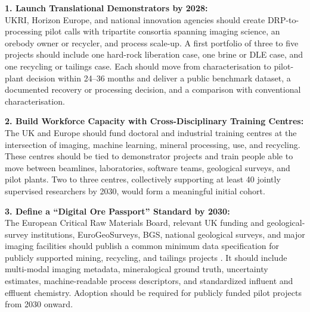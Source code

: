 \documentclass[12pt,a4paper]{article}
\begin{document}
\begin{tcolorbox}[enhanced, colback=gray!3!white, colframe=blue!40!black,
title=\textbf{Key Policy Recommendations}, colbacktitle=blue!40!black,
drop fuzzy shadow, fonttitle=\bfseries\normalsize, arc=1.2mm, boxrule=0.7pt,
boxsep=0.6mm, left=0.9mm, right=0.9mm, top=0.7mm, bottom=0.7mm,
toptitle=0.7mm, bottomtitle=0.7mm, fontupper=\normalsize,
before upper={\setlength{\parskip}{0.8pt}\setlength{\parindent}{0pt}\setlength{\baselineskip}{11.8pt}}]
\textbf{1. Launch Translational Demonstrators by 2028:}\\
UKRI, Horizon Europe, and national innovation agencies should create DRP-to-processing pilot calls with tripartite consortia spanning imaging science, an orebody owner or recycler, and process scale-up. A first portfolio of three to five projects should include one hard-rock liberation case, one brine or DLE case, and one recycling or tailings case. Each should move from characterisation to pilot-plant decision within 24--36 months and deliver a public benchmark dataset, a documented recovery or processing decision, and a comparison with conventional characterisation.

\vspace{2.4mm}
\textbf{2. Build Workforce Capacity with Cross-Disciplinary Training Centres:}\\
The UK and Europe should fund doctoral and industrial training centres at the intersection of imaging, machine learning, mineral processing, use, and recycling. These centres should be tied to demonstrator projects and train people able to move between beamlines, laboratories, software teams, geological surveys, and pilot plants. Two to three centres, collectively supporting at least 40 jointly supervised researchers by 2030, would form a meaningful initial cohort.

\vspace{2.4mm}
\textbf{3. Define a ``Digital Ore Passport'' Standard by 2030:}\\
The European Critical Raw Materials Board, relevant UK funding and geological-survey institutions, EuroGeoSurveys, BGS, national geological surveys, and major imaging facilities should publish a common minimum data specification for publicly supported mining, recycling, and tailings projects \cite{eu_crm_board_2026, bgs_uk_crm_2022, uk_vision_2035_2026}. It should include multi-modal imaging metadata, mineralogical ground truth, uncertainty estimates, machine-readable process descriptors, and standardized influent and effluent chemistry. Adoption should be required for publicly funded pilot projects from 2030 onward.


\end{tcolorbox}
\end{document}
